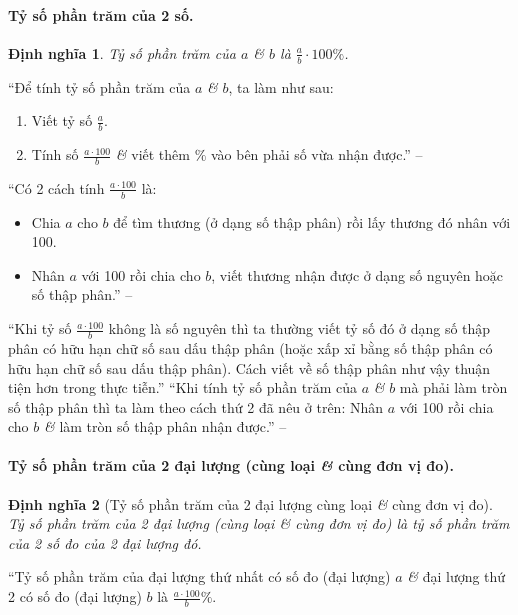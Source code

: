 \documentclass{article}
\numberwithin{equation}{section}
\newtheorem{definition}{Định nghĩa}[section]
\begin{document}
\paragraph{Tỷ số phần trăm của 2 số.}
\begin{definition}
	\emph{Tỷ số phần trăm} của $a$ \textit{\&} $b$ là $\frac{a}{b}\cdot 100\%$.
\end{definition}
``Để tính tỷ số phần trăm của $a$ \textit{\&} $b$, ta làm như sau:
\begin{enumerate}
	\item Viết tỷ số $\frac{a}{b}$.
	\item Tính số $\frac{a\cdot100}{b}$ \textit{\&} viết thêm $\%$ vào bên phải số vừa nhận được.'' -- \cite[p. 63]{Thai_Anh_Dat_Ha_Loan_Nam_Quang_Toan_6_tap_2}
\end{enumerate}
``Có 2 cách tính $\frac{a\cdot 100}{b}$ là:
\begin{itemize}
	\item Chia $a$ cho $b$ để tìm thương (ở dạng số thập phân) rồi lấy thương đó nhân với 100.
	\item Nhân $a$ với 100 rồi chia cho $b$, viết thương nhận được ở dạng số nguyên hoặc số thập phân.'' -- \cite[p. 63]{Thai_Anh_Dat_Ha_Loan_Nam_Quang_Toan_6_tap_2}
\end{itemize}
``Khi tỷ số $\frac{a\cdot 100}{b}$ không là số nguyên thì ta thường viết tỷ số đó ở dạng số thập phân có hữu hạn chữ số sau dấu thập phân (hoặc xấp xỉ bằng số thập phân có hữu hạn chữ số sau dấu thập phân). Cách viết về số thập phân như vậy thuận tiện hơn trong thực tiễn.'' ``Khi tính tỷ số phần trăm của $a$ \textit{\&} $b$ mà phải làm tròn số thập phân thì ta làm theo cách thứ 2 đã nêu ở trên: Nhân $a$ với 100 rồi chia cho $b$ \textit{\&} làm tròn số thập phân nhận được.'' -- \cite[p. 64]{Thai_Anh_Dat_Ha_Loan_Nam_Quang_Toan_6_tap_2}

\paragraph{Tỷ số phần trăm của 2 đại lượng (cùng loại \textit{\&} cùng đơn vị đo).}
\begin{definition}[Tỷ số phần trăm của 2 đại lượng cùng loại \textit{\&} cùng đơn vị đo]
	 \emph{Tỷ số phần trăm của 2 đại lượng (cùng loại \textit{\&} cùng đơn vị đo)} là tỷ số phần trăm của 2 số đo của 2 đại lượng đó.
\end{definition}
``Tỷ số phần trăm của đại lượng thứ nhất có số đo (đại lượng) $a$ \textit{\&} đại lượng thứ 2 có số đo (đại lượng) $b$ là $\frac{a\cdot100}{b}\%$.
\end{document}
